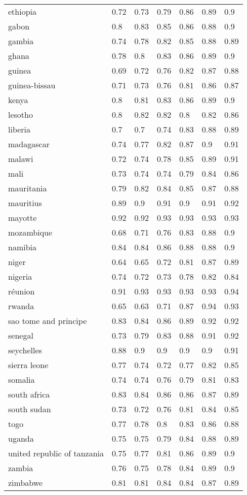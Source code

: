 \begin{longtable}[t]{lllllll}
ethiopia & 0.72 & 0.73 & 0.79 & 0.86 & 0.89 & 0.9\\
gabon & 0.8 & 0.83 & 0.85 & 0.86 & 0.88 & 0.9\\
gambia & 0.74 & 0.78 & 0.82 & 0.85 & 0.88 & 0.89\\
ghana & 0.78 & 0.8 & 0.83 & 0.86 & 0.89 & 0.9\\
\addlinespace
guinea & 0.69 & 0.72 & 0.76 & 0.82 & 0.87 & 0.88\\
guinea-bissau & 0.71 & 0.73 & 0.76 & 0.81 & 0.86 & 0.87\\
kenya & 0.8 & 0.81 & 0.83 & 0.86 & 0.89 & 0.9\\
lesotho & 0.8 & 0.82 & 0.82 & 0.8 & 0.82 & 0.86\\
liberia & 0.7 & 0.7 & 0.74 & 0.83 & 0.88 & 0.89\\
\addlinespace
madagascar & 0.74 & 0.77 & 0.82 & 0.87 & 0.9 & 0.91\\
malawi & 0.72 & 0.74 & 0.78 & 0.85 & 0.89 & 0.91\\
mali & 0.73 & 0.74 & 0.74 & 0.79 & 0.84 & 0.86\\
mauritania & 0.79 & 0.82 & 0.84 & 0.85 & 0.87 & 0.88\\
mauritius & 0.89 & 0.9 & 0.91 & 0.9 & 0.91 & 0.92\\
\addlinespace
mayotte & 0.92 & 0.92 & 0.93 & 0.93 & 0.93 & 0.93\\
mozambique & 0.68 & 0.71 & 0.76 & 0.83 & 0.88 & 0.9\\
namibia & 0.84 & 0.84 & 0.86 & 0.88 & 0.88 & 0.9\\
niger & 0.64 & 0.65 & 0.72 & 0.81 & 0.87 & 0.89\\
nigeria & 0.74 & 0.72 & 0.73 & 0.78 & 0.82 & 0.84\\
\addlinespace
réunion & 0.91 & 0.93 & 0.93 & 0.93 & 0.93 & 0.94\\
rwanda & 0.65 & 0.63 & 0.71 & 0.87 & 0.94 & 0.93\\
sao tome and principe & 0.83 & 0.84 & 0.86 & 0.89 & 0.92 & 0.92\\
senegal & 0.73 & 0.79 & 0.83 & 0.88 & 0.91 & 0.92\\
seychelles & 0.88 & 0.9 & 0.9 & 0.9 & 0.9 & 0.91\\
\addlinespace
sierra leone & 0.77 & 0.74 & 0.72 & 0.77 & 0.82 & 0.85\\
somalia & 0.74 & 0.74 & 0.76 & 0.79 & 0.81 & 0.83\\
south africa & 0.83 & 0.84 & 0.86 & 0.86 & 0.87 & 0.89\\
south sudan & 0.73 & 0.72 & 0.76 & 0.81 & 0.84 & 0.85\\
togo & 0.77 & 0.78 & 0.8 & 0.83 & 0.86 & 0.88\\
\addlinespace
uganda & 0.75 & 0.75 & 0.79 & 0.84 & 0.88 & 0.89\\
united republic of tanzania & 0.75 & 0.77 & 0.81 & 0.86 & 0.89 & 0.9\\
zambia & 0.76 & 0.75 & 0.78 & 0.84 & 0.89 & 0.9\\
zimbabwe & 0.81 & 0.81 & 0.84 & 0.84 & 0.87 & 0.89\\*
\end{longtable}
\endgroup{}
